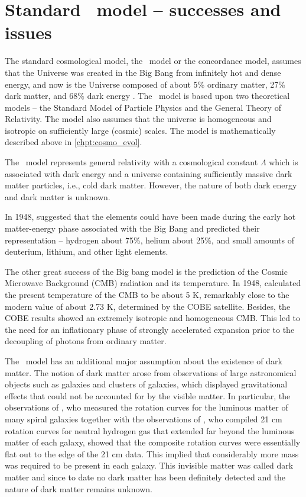 \section{Standard \LCDM\ model -- successes and issues}
The standard cosmological model, the \LCDM\ model or the concordance model, assumes that the Universe was created in the Big Bang from infinitely hot and dense energy, and now is the Universe composed of about 5\% ordinary matter, 27\% dark matter, and 68\% dark energy \parencite{redefineLCDM}. The \LCDM\ model is based upon two theoretical models -- the Standard Model of Particle Physics and  the General Theory of Relativity. The model also assumes that the universe is homogeneous and isotropic on sufficiently large (cosmic) scales. The model is mathematically described above in \autoref{chpt:cosmo_evol}.

The \LCDM\ model represents general relativity with a cosmological constant \(\Lambda\) which is associated with dark energy and a universe containing sufficiently massive dark matter particles, i.e., cold dark matter. However, the nature of both dark energy and dark matter is unknown.

In 1948, \textcite{PhysRev.74.505.2} suggested that the elements could have been made during the early hot matter-energy phase associated with the Big Bang and predicted their representation -- hydrogen about 75\%, helium about 25\%, and small amounts of deuterium, lithium, and other light elements.

The other great success of the Big bang model is the prediction of the Cosmic Microwave Background (CMB) radiation and its temperature. In 1948, \textcite{1948Natur.162..774A} calculated the present temperature of the CMB to be about 5 K, remarkably close to the modern value of about 2.73 K, determined by the COBE satellite. Besides, the COBE results showed an extremely isotropic and homogeneous CMB. This led to the need for an inflationary phase \parencite{1981PhRvD..23..347G} of strongly accelerated expansion prior to the decoupling of photons from ordinary matter.

The \LCDM\ model has an additional major assumption about the existence of dark matter. The notion of dark matter arose from observations of large astronomical objects such as galaxies and clusters of galaxies, which displayed gravitational effects that could not be accounted for by the visible matter. In particular, the observations of \textcite{1980ApJ...238..471R}, who measured the rotation curves for the luminous matter of many spiral galaxies together with the observations of \textcite{1978PhDT.......195B}, who compiled 21 cm rotation curves for neutral hydrogen gas that extended far beyond the luminous matter of each galaxy, showed that the composite rotation curves were essentially flat out to the edge of the 21 cm data. This implied that considerably more mass was required to be present in each galaxy. This invisible matter was called dark matter and since to date no dark matter has been definitely detected and the nature of dark matter remains unknown.

